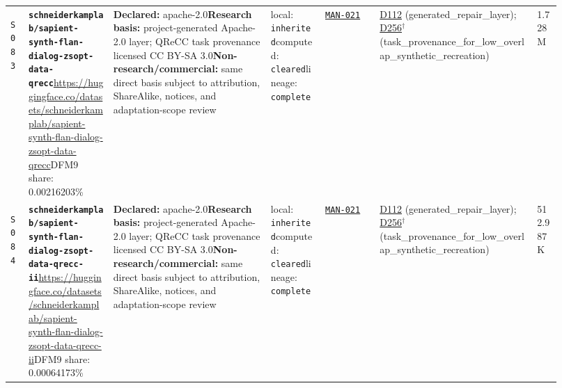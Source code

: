 \documentclass[9pt,a4paper]{article}
\newcommand{\srcid}[1]{\hypertarget{src:#1}{\texttt{#1}}}
\begin{document}
\begin{landscape}
\begin{longtable}{@{}L{0.03\linewidth}L{0.14\linewidth}L{0.26\linewidth}L{0.09\linewidth}L{0.09\linewidth}L{0.265\linewidth}L{0.045\linewidth}@{}}
\srcid{S083} & \textbf{\nolinkurl{schneiderkamplab/sapient-synth-flan-dialog-zsopt-data-qrecc}}\newline \url{https://huggingface.co/datasets/schneiderkamplab/sapient-synth-flan-dialog-zsopt-data-qrecc}\newline DFM9 share: 0.00216203\% & \textbf{Declared:} apache-2.0\newline \textbf{Research basis:} project-generated Apache-2.0 layer; QReCC task provenance licensed CC BY-SA 3.0\newline \textbf{Non-research/commercial:} same direct basis subject to attribution, ShareAlike, notices, and adaptation-scope review & local: \texttt{inherited}\newline computed: \texttt{cleared}\newline lineage: \texttt{complete} & \hyperlink{manual:MAN-021}{\texttt{MAN-021}} & \hyperlink{dep:D112}{D112} (generated\_repair\_layer); \hyperlink{dep:D256}{D256}$^{\dagger}$ (task\_provenance\_for\_low\_overlap\_synthetic\_recreation) & 1.728M \\
\srcid{S084} & \textbf{\nolinkurl{schneiderkamplab/sapient-synth-flan-dialog-zsopt-data-qrecc-ii}}\newline \url{https://huggingface.co/datasets/schneiderkamplab/sapient-synth-flan-dialog-zsopt-data-qrecc-ii}\newline DFM9 share: 0.00064173\% & \textbf{Declared:} apache-2.0\newline \textbf{Research basis:} project-generated Apache-2.0 layer; QReCC task provenance licensed CC BY-SA 3.0\newline \textbf{Non-research/commercial:} same direct basis subject to attribution, ShareAlike, notices, and adaptation-scope review & local: \texttt{inherited}\newline computed: \texttt{cleared}\newline lineage: \texttt{complete} & \hyperlink{manual:MAN-021}{\texttt{MAN-021}} & \hyperlink{dep:D112}{D112} (generated\_repair\_layer); \hyperlink{dep:D256}{D256}$^{\dagger}$ (task\_provenance\_for\_low\_overlap\_synthetic\_recreation) & 512.987K \\

\end{longtable}
\end{landscape}
\end{document}
